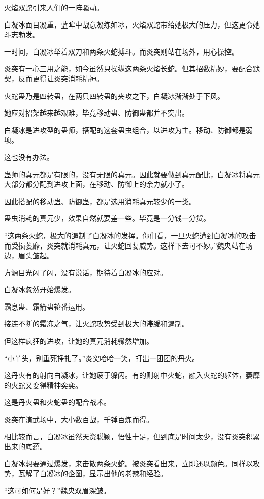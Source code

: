 \begin{this_body}
火焰双蛇引来人们的一阵骚动。

白凝冰面目凝重，蓝眸中战意凝练如冰，火焰双蛇带给她极大的压力，但这更令她斗志勃发。

一时间，白凝冰举着双刀和两条火蛇搏斗。而炎突则站在场外，用心操控。

炎突有一心三用之能，如今虽然只操纵这两条火焰长蛇。但其招数精妙，要配合默契，反而更得让炎突消耗精神。

火蛇蛊乃是四转蛊，在两只四转蛊的夹攻之下，白凝冰渐渐处于下风。

她应对招架越来越艰难，毕竟移动蛊、防御蛊都并不突出。

白凝冰是进攻型的蛊师，搭配的这套蛊虫组合，以进攻为主。移动、防御都是弱项。

这也没有办法。

蛊师的真元都是有限的，没有无限的真元。因此就要做到真元配比，白凝冰将真元大部分都分配到进攻上面，在移动、防御上的余力就小了。

因此搭配的移动蛊、防御蛊，都是选用消耗真元较少的一类。

蛊虫消耗的真元少，效果自然就要差一些。毕竟是一分钱一分货。

“这两条火蛇，极大的遏制了白凝冰的发挥。你们看，一旦火蛇遭到白凝冰的攻击而受损萎靡，炎突就消耗真元，让火蛇回复威势。这样下去可不妙。”魏央站在场边，眉头皱起。

方源目光闪了闪，没有说话，期待着白凝冰的应对。

白凝冰忽然开始爆发。

霜息蛊、霜箭蛊轮番运用。

接连不断的霜冻之气，让火蛇攻势受到极大的滞缓和遏制。

但这样疯狂的进攻，让她的真元消耗骤然增加。

“小丫头，别垂死挣扎了。”炎突哈哈一笑，打出一团团的丹火。

这丹火有的射向白凝冰，让她疲于躲闪。有的则射中火蛇，融入火蛇的躯体，萎靡的火蛇又变得精神奕奕。

这是丹火蛊和火蛇蛊的配合战术。

炎突在演武场中，大小数百战，千锤百炼而得。

相比较而言，白凝冰虽然天资聪颖，悟性十足，但到底是时间太少，没有炎突积累出来的底蕴。

白凝冰想要通过爆发，来击散两条火蛇。被炎突看出来，立即还以颜色。同样以攻势，瓦解了白凝冰的企图，显示出他的老辣和经验。

“这可如何是好？”魏央双眉深皱。


\end{this_body}
